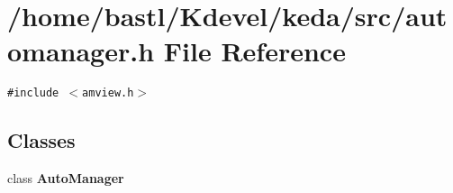 \section{/home/bastl/Kdevel/keda/src/automanager.h File Reference}
\label{automanager_8h}
{\tt \#include $<$amview.h$>$}\par
\subsection*{Classes}
\begin{CompactItemize}
\item 
class {\bf Auto\-Manager}
\end{CompactItemize}
